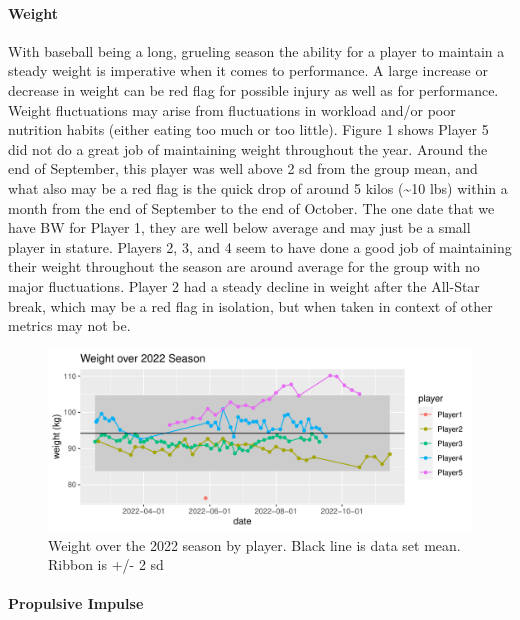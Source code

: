 \documentclass[
  12pt,
]{article}
\begin{document}
\hypertarget{weight}{%
\paragraph{Weight}\label{weight}}

With baseball being a long, grueling season the ability for a player to
maintain a steady weight is imperative when it comes to performance. A
large increase or decrease in weight can be red flag for possible injury
as well as for performance. Weight fluctuations may arise from
fluctuations in workload and/or poor nutrition habits (either eating too
much or too little). Figure 1 shows Player 5 did not do a great job of
maintaining weight throughout the year. Around the end of September,
this player was well above 2 sd from the group mean, and what also may
be a red flag is the quick drop of around 5 kilos (\textasciitilde10
lbs) within a month from the end of September to the end of October. The
one date that we have BW for Player 1, they are well below average and
may just be a small player in stature. Players 2, 3, and 4 seem to have
done a good job of maintaining their weight throughout the season are
around average for the group with no major fluctuations. Player 2 had a
steady decline in weight after the All-Star break, which may be a red
flag in isolation, but when taken in context of other metrics may not
be.

\begin{figure}
\centering
\includegraphics{report_code_files/figure-latex/weight-1.pdf}
\caption{Weight over the 2022 season by player. Black line is data set
mean. Ribbon is +/- 2 sd}
\end{figure}

\hypertarget{propulsive-impulse}{%
\paragraph{Propulsive Impulse}\label{propulsive-impulse}}
\end{document}
